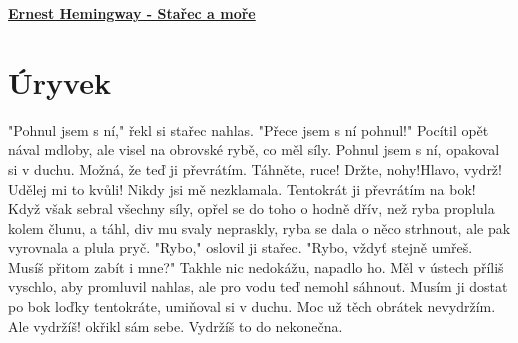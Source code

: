 \documentclass[11pt]{article}
\begin{document}
    \begin{center}
        \underline{\textbf{\Huge Ernest Hemingway - Stařec a moře}}
    \end{center}
    \section*{Úryvek}
    "Pohnul jsem s ní," řekl si stařec nahlas. "Přece jsem s ní pohnul!"
Pocítil opět nával mdloby, ale visel na obrovské rybě, co měl síly.
Pohnul jsem s ní, opakoval si v duchu. Možná, že teď ji převrátím. Táhněte, ruce! Držte, nohy!Hlavo, vydrž! Udělej mi to kvůli! Nikdy jsi mě nezklamala. Tentokrát ji převrátím na bok!
Když však sebral všechny síly, opřel se do toho o hodně dřív, než ryba proplula kolem člunu, a táhl, div mu svaly nepraskly, ryba se dala o něco strhnout, ale pak vyrovnala a plula pryč.
"Rybo," oslovil ji stařec. "Rybo, vždyť stejně umřeš. Musíš přitom zabít i mne?"
Takhle nic nedokážu, napadlo ho. Měl v ústech příliš vyschlo, aby promluvil nahlas, ale pro vodu teď nemohl sáhnout. Musím ji dostat po bok loďky tentokráte, umiňoval si v duchu. Moc už těch obrátek nevydržím. Ale vydržíš! okřikl sám sebe. Vydržíš to do nekonečna.
\end{document}
